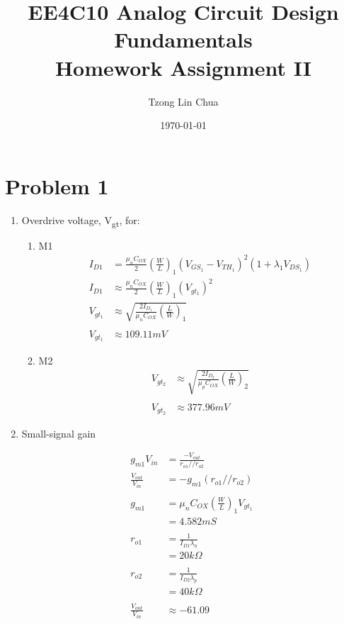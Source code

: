 \documentclass{article}
\author{Tzong Lin Chua}
\date{\today}
\title{EE4C10 Analog Circuit Design Fundamentals\\\medskip
\large Homework Assignment II }
\begin{document}
\maketitle
\tableofcontents


\section{Problem 1}
\label{sec:org30ad0b8}
\begin{enumerate}
\item Overdrive voltage, V\textsubscript{gt}, for:
\begin{enumerate}
\item M1
\begin{equation*}
\begin{aligned}
I_{D1} &= \frac{\mu_{n}C_{OX}}{2}(\frac{W}{L})_{1}(V_{GS_{1}} - V_{TH_{1}})^2(1 + \lambda_{1}V_{DS_{1}}) \\
I_{D1} &\approx \frac{\mu_{n}C_{OX}}{2}(\frac{W}{L})_{1}(V_{gt_{1}})^2 \\
V_{gt_{1}} &\approx \sqrt{\frac{2 I_{D_{1}}}{\mu_{n}C_{OX}}(\frac{L}{W})_{1}} \\
\\
V_{gt_{1}} &\approx 109.11 mV
\end{aligned}
\end{equation*}

\item M2
\begin{equation*}
\begin{aligned}
V_{gt_{2}} &\approx \sqrt{\frac{2 I_{D_{2}}}{\mu_{p}C_{OX}}(\frac{L}{W})_{2}} \\
\\
V_{gt_{2}} &\approx 377.96 mV
\end{aligned}
\end{equation*}
\end{enumerate}

\item Small-signal gain

\begin{equation*}
\begin{aligned}
g_{m1}V_{in} &= \frac{-V_{out}}{r_{o1}//r_{o2}} \\
\frac{V_{out}}{V_{in}} &= -g_{m1}(r_{o1}//r_{o2}) \\
\\
g_{m1} &= \mu_{n}C_{OX} (\frac{W}{L})_{1} V_{gt_1} \\
&= 4.582 mS \\
\\
r_{o1} &= \frac{1}{I_{D1}\lambda_{n}} \\
&= 20 k\Omega \\
\\
r_{o2} &= \frac{1}{I_{D2}\lambda_{p}} \\
&= 40 k\Omega \\
\\
\frac{V_{out}}{V_{in}} &\approx -61.09 \\
\end{aligned}
\end{equation*}


\end{enumerate}
\end{document}
